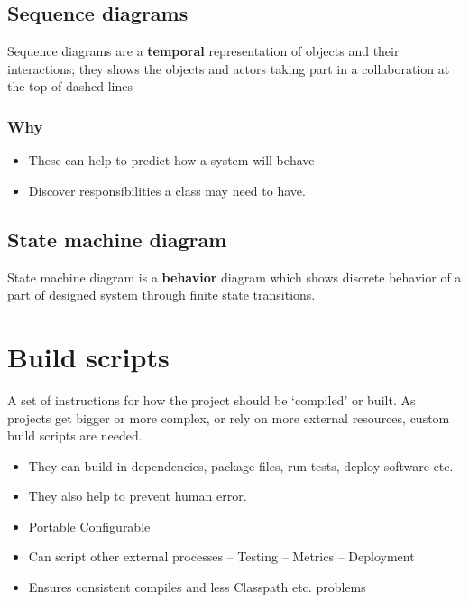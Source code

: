 \documentclass{article}
\begin{document}
\subsection{Sequence diagrams}
\begin{flushleft}
Sequence diagrams are a \textbf{temporal} representation of objects and their interactions; they shows the objects and actors taking part in a collaboration at the top of dashed lines
\end{flushleft}
\subsubsection{Why}
\begin{itemize}
	\item These can help to predict how a system will behave
	\item Discover responsibilities a class may need to have.
\end{itemize}

\subsection{State machine diagram}
\begin{flushleft}
State machine diagram is a \textbf{behavior} diagram which shows discrete behavior of a part of designed system through finite state transitions.
\end{flushleft}

\section{Build scripts}
\begin{flushleft}
A set of instructions for how the project should be ‘compiled’ or built. As projects get bigger or more complex, or rely on more external resources, custom build scripts are needed.
\begin{itemize}
    \item They can build in dependencies, package files, run tests, deploy software etc.
    \item They also help to prevent human error.
	\item Portable  Configurable
	\item Can script other external processes – Testing – Metrics – Deployment
	\item Ensures consistent compiles and less Classpath etc. problems
\end{itemize}
\end{flushleft}
\end{document}
